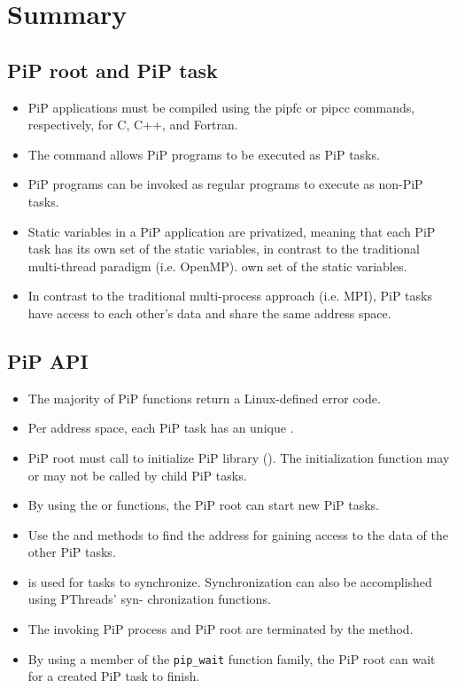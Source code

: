 
\section{Summary}

\subsection*{PiP root and PiP task}

\begin{itemize}
\item PiP applications must be compiled using the pipfc or pipcc
  commands, respectively, for C, C++, and Fortran.
\item The  command allows PiP programs to be executed as PiP
  tasks.
\item PiP programs can be invoked as regular programs to execute as
  non-PiP tasks.
\item Static variables in a PiP application are privatized, meaning
  that each PiP task has its own set of the static variables, in
  contrast to the traditional multi-thread paradigm (i.e. OpenMP).
  own set of the static variables.
\item In contrast to the traditional multi-process approach
  (i.e. MPI), PiP tasks have access to each other's data and share
  the same address space.
\end{itemize}

\subsection*{PiP API}

\begin{itemize}
\item The majority of PiP functions return a Linux-defined error code.
\item Per address space, each PiP task has an unique {\PIPID}.
\item PiP root must call  to initialize PiP library (). The
  initialization function may or may not be called by child PiP tasks.
\item By using the  or
   functions, the PiP root can start new PiP
  tasks. 
\item Use the  and
   methods to find the address for gaining
  access to the data of the other PiP tasks.
\item {} is used for tasks to
  synchronize. Synchronization can also be accomplished using
  PThreads' syn- chronization functions. 
\item The invoking PiP process and PiP root are terminated by the
   method. 
\item By using a member of the {\tt pip_wait} function family, the PiP
  root can wait for a created PiP task to finish.
\end{itemize}
 
